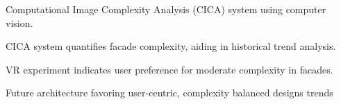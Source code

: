 
\item Computational Image Complexity Analysis (CICA) system using computer vision.
\item CICA system quantifies facade complexity, aiding in historical trend analysis.
\item VR experiment indicates user preference for moderate complexity in facades.
\item Future architecture favoring user-centric, complexity balanced designs trends
